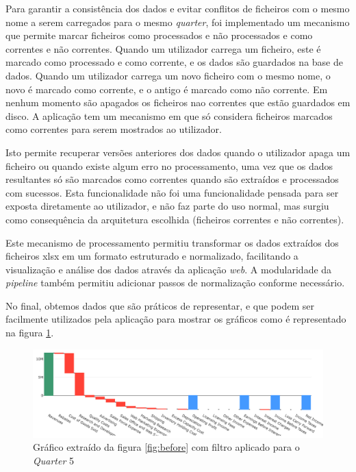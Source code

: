Para garantir a consistência dos dados e evitar conflitos de ficheiros com o mesmo nome a serem carregados para o mesmo \textit{quarter}, foi implementado um mecanismo que permite marcar ficheiros como processados e não processados e como correntes e não correntes. Quando um utilizador carrega um ficheiro, este é marcado como processado e como corrente, e os dados são guardados na base de dados. Quando um utilizador carrega um novo ficheiro com o mesmo nome, o novo é marcado como corrente, e o antigo é marcado como não corrente. Em nenhum momento são apagados os ficheiros nao correntes que estão guardados em disco. A aplicação tem um mecanismo em que só considera ficheiros marcados como correntes para serem mostrados ao utilizador.

Isto permite recuperar versões anteriores dos dados quando o utilizador apaga um ficheiro ou quando existe algum erro no processamento, uma vez que os dados resultantes só são marcados como correntes quando são extraídos e processados com sucessos. Esta funcionalidade não foi uma funcionalidade pensada para ser exposta diretamente ao utilizador, e não faz parte do uso normal, mas surgiu como consequência da arquitetura escolhida (ficheiros correntes e não correntes).

Este mecanismo de processamento permitiu transformar os dados extraídos dos ficheiros \gls{xlsx} em um formato estruturado e normalizado, facilitando a visualização e análise dos dados através da aplicação \textit{web}. A modularidade da \textit{pipeline} também permitiu adicionar passos de normalização conforme necessário.

No final, obtemos dados que são práticos de representar, e que podem ser facilmente utilizados pela aplicação para mostrar os gráficos como é representado na figura \ref{fig:after}.

\begin{figure}[H]
\centering
\includegraphics[max width=\textwidth]{./img/after}
\caption{Gráfico extraído da figura \ref{fig:before} com filtro aplicado para o \textit{Quarter} 5}
\label{fig:after}
\end{figure}

